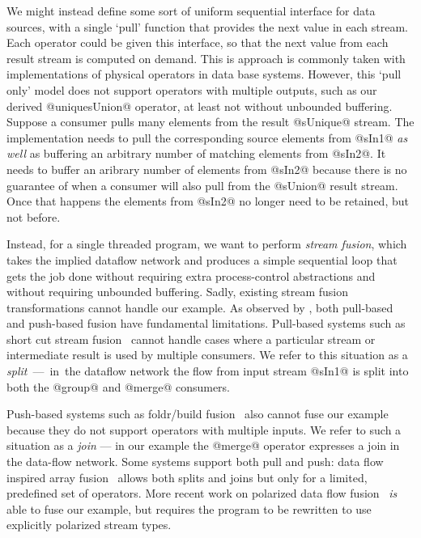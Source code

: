 We might instead define some sort of uniform sequential interface for data sources, with a single `pull' function that provides the next value in each stream. Each operator could be given this interface, so that the next value from each result stream is computed on demand. This is approach is commonly taken with implementations of physical operators in data base systems. However, this `pull only' model does not support operators with multiple outputs, such as our derived @uniquesUnion@ operator, at least not without unbounded buffering. Suppose a consumer pulls many elements from the result @sUnique@ stream. The implementation needs to pull the corresponding source elements from @sIn1@ \emph{as well} as buffering an arbitrary number of matching elements from @sIn2@. It needs to buffer an aribrary number of elements from @sIn2@ because there is no guarantee of when a consumer will also pull from the @sUnion@ result stream. Once that happens the elements from @sIn2@ no longer need to be retained, but not before.

Instead, for a single threaded program, we want to perform \emph{stream fusion}, which takes the implied dataflow network and produces a simple sequential loop that gets the job done without requiring extra process-control abstractions and without requiring unbounded buffering. Sadly, existing stream fusion transformations cannot handle our example. As observed by \citet{kay2009you}, both pull-based and push-based fusion have fundamental limitations. Pull-based systems such as short cut stream fusion~\cite{coutts2007stream} cannot handle cases where a particular stream or intermediate result is used by multiple consumers. We refer to this situation as a \mbox{\emph{split} --- in the} dataflow network the flow from input stream @sIn1@ is split into both the @group@ and @merge@ consumers. 


Push-based systems such as foldr/build fusion~\cite{gill1993short} also cannot fuse our example because they do not support operators with multiple inputs. We refer to such a situation as a \emph{join} --- in our example the @merge@ operator expresses a join in the data-flow network. Some systems support both pull and push: data flow inspired array fusion~\cite{lippmeier2013data} allows both splits and joins but only for a limited, predefined set of operators. More recent work on polarized data flow fusion~\cite{lippmeier2016polarized} \emph{is} able to fuse our example, but requires the program to be rewritten to use explicitly polarized stream types. 

